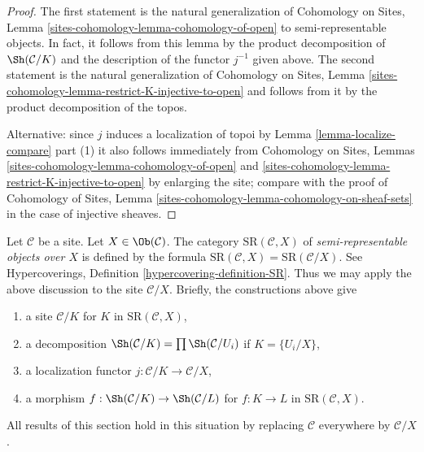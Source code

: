 \begin{proof}
The first statement is the natural generalization of
Cohomology on Sites, Lemma
\ref{sites-cohomology-lemma-cohomology-of-open}
to semi-representable objects.
In fact, it follows from this lemma
by the product decomposition of $\Sh(\mathcal{C}/K)$
and the description of the functor $j^{-1}$ given above.
The second statement is the natural generalization of
Cohomology on Sites, Lemma
\ref{sites-cohomology-lemma-restrict-K-injective-to-open}
and follows from it by the product decomposition of the topos.

\medskip\noindent
Alternative: since $j$ induces a localization of topoi by
Lemma \ref{lemma-localize-compare} part (1)
it also follows immediately from
Cohomology on Sites, Lemmas \ref{sites-cohomology-lemma-cohomology-of-open}
and \ref{sites-cohomology-lemma-restrict-K-injective-to-open}
by enlarging the site; compare with the proof of
Cohomology of Sites, Lemma
\ref{sites-cohomology-lemma-cohomology-on-sheaf-sets}
in the case of injective sheaves.
\end{proof}

\begin{remark}
\label{remark-semi-representable-over-object}
Let $\mathcal{C}$ be a site. Let $X \in \Ob(\mathcal{C})$.
The category $\text{SR}(\mathcal{C}, X)$
of {\it semi-representable objects over $X$}
is defined by the formula
$\text{SR}(\mathcal{C}, X) = \text{SR}(\mathcal{C}/X)$.
See Hypercoverings, Definition \ref{hypercovering-definition-SR}.
Thus we may apply the above discussion to the site
$\mathcal{C}/X$. Briefly, the constructions above give
\begin{enumerate}
\item a site $\mathcal{C}/K$ for $K$ in $\text{SR}(\mathcal{C}, X)$,
\item a decomposition
$\Sh(\mathcal{C}/K) = \prod \Sh(\mathcal{C}/U_i)$ if $K = \{U_i/X\}$,
\item a localization functor $j : \mathcal{C}/K \to \mathcal{C}/X$,
\item a morphism $f : \Sh(\mathcal{C}/K) \to \Sh(\mathcal{C}/L)$
for $f : K \to L$ in $\text{SR}(\mathcal{C}, X)$.
\end{enumerate}
All results of this section hold in this situation by replacing
$\mathcal{C}$ everywhere by $\mathcal{C}/X$.
\end{remark}


